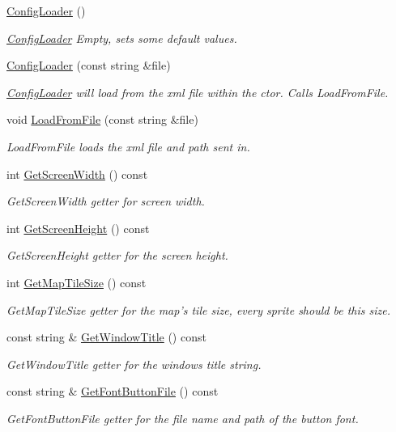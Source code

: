 \begin{DoxyCompactItemize}
\item 
\hyperlink{class_config_loader_a607f9ae08faeb07203f0c83deb2f1411}{Config\-Loader} ()
\begin{DoxyCompactList}\small\item\em \hyperlink{class_config_loader}{Config\-Loader} Empty, sets some default values. \end{DoxyCompactList}\item 
\hyperlink{class_config_loader_a737f2f05846fc9dc8c600048b9ffa3a5}{Config\-Loader} (const string \&file)
\begin{DoxyCompactList}\small\item\em \hyperlink{class_config_loader}{Config\-Loader} will load from the xml file within the ctor. Calls Load\-From\-File. \end{DoxyCompactList}\item 
void \hyperlink{class_config_loader_a33359465c5c498c6fc7ed1a882d2a3a2}{Load\-From\-File} (const string \&file)
\begin{DoxyCompactList}\small\item\em Load\-From\-File loads the xml file and path sent in. \end{DoxyCompactList}\item 
int \hyperlink{class_config_loader_acbbfb353a72e5598c3543b55d24d6dd4}{Get\-Screen\-Width} () const 
\begin{DoxyCompactList}\small\item\em Get\-Screen\-Width getter for screen width. \end{DoxyCompactList}\item 
int \hyperlink{class_config_loader_a7ff313b04b1be4114a21f0e51546fd1a}{Get\-Screen\-Height} () const 
\begin{DoxyCompactList}\small\item\em Get\-Screen\-Height getter for the screen height. \end{DoxyCompactList}\item 
int \hyperlink{class_config_loader_ae873a1c3b9731deba2556abbb2f6d938}{Get\-Map\-Tile\-Size} () const 
\begin{DoxyCompactList}\small\item\em Get\-Map\-Tile\-Size getter for the map's tile size, every sprite should be this size. \end{DoxyCompactList}\item 
const string \& \hyperlink{class_config_loader_a55cee5177043589a7700b41f7ac14bd9}{Get\-Window\-Title} () const 
\begin{DoxyCompactList}\small\item\em Get\-Window\-Title getter for the windows title string. \end{DoxyCompactList}\item 
const string \& \hyperlink{class_config_loader_a6da3571168af1d791fc81089326ab977}{Get\-Font\-Button\-File} () const 
\begin{DoxyCompactList}\small\item\em Get\-Font\-Button\-File getter for the file name and path of the button font. \end{DoxyCompactList}\end{DoxyCompactItemize}


